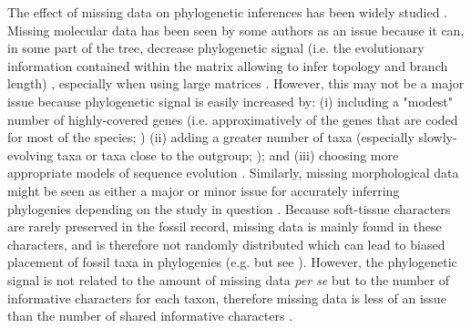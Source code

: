 \documentclass[12pt,letterpaper]{article}
\begin{document}
The effect of missing data on phylogenetic inferences has been widely studied \citep{wiensmissing2003,wiensmissing2006,wiensmissing2008,lemmonthe2009,rouresite-specific2011,sansomfossilization2013,pattinsonphylogeny2014}. Missing molecular data has been seen by some authors as an issue because it can, in some part of the tree, decrease phylogenetic signal (i.e. the evolutionary information contained within the matrix allowing to infer topology and branch length)%
    , especially when using large matrices \citep{lemmonthe2009}. However, this may not be a major issue because phylogenetic signal is easily increased by:
(i) including a "modest" number of highly-covered genes (i.e. approximatively of the genes that are coded for most of the species; \citealt{rouresite-specific2011}) %
(ii) adding a greater number of taxa (especially slowly-evolving taxa or taxa close to the outgroup; \citealt{rouresite-specific2011}); and (iii) choosing more appropriate models of sequence evolution \citep{wiensmissing2006,wiensmissing2008,rouresite-specific2011}. Similarly, missing morphological data might be seen as either a major or minor issue for accurately inferring phylogenies depending on the study in question \citep{wiensmissing2003,sansomfossilization2013,pattinsonphylogeny2014}. Because soft-tissue characters are rarely preserved in the fossil record, missing data is mainly found in these characters, and is therefore not randomly distributed which can lead to biased placement of fossil taxa in phylogenies (e.g. \citeauthor{sansomfossilization2013} \citeyear{sansomfossilization2013} but see \citeauthor{pattinsonphylogeny2014} \citeyear{pattinsonphylogeny2014}). However, the phylogenetic signal is not related to the amount of missing data \textit{per se} but to the number of informative characters for each taxon, therefore missing data is less of an issue than the number of shared informative characters \citep{wiensmissing2003}.
\end{document}
